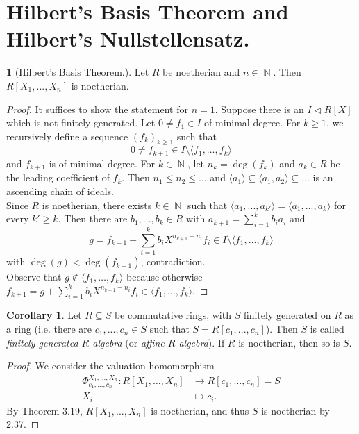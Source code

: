 \documentclass[12pt,a4paper]{report}
\theoremstyle{definition}
\newtheorem{corollary}[theorem]{Corollary} %
\theoremstyle{num.custom-title}
\newtheorem{teo_custom-title}[theorem]{} %
\DeclareMathOperator{\N}{\mathbb{N}}
\DeclareMathOperator{\sm}{\setminus}
\DeclareMathOperator{\sse}{\subseteq}
\begin{document}
\section{Hilbert's Basis Theorem and Hilbert's Nullstellensatz.}

\begin{teo_custom-title}[Hilbert's Basis Theorem.]
Let $R$ be noetherian and $n \in \N$. Then $R[X_1,...,X_n]$ is noetherian.
\begin{proof}
It suffices to show the statement for $n=1$. Suppose there is an $I \lhd R[X]$ which is not finitely generated. Let $0 \neq f_1 \in I$ of minimal degree. For $k \geq 1$, we recursively define a sequence $(f_k)_{k \geq 1}$ such that
\[
0 \neq f_{k+1} \in I \sm \langle f_1, \ldots , f_k \rangle
\]
and $f_{k+1}$ is of minimal degree. For $k \in \N$, let $n_k = \deg(f_k)$ and $a_k \in R$ be the leading coefficient of $f_k$. Then $n_1 \leq n_2 \leq ...$ and $\langle a_1 \rangle \sse \langle a_1,a_2 \rangle \sse ...$ is an ascending chain of ideals.\\
Since $R$ is noetherian, there exists $k \in \N$ such that $\langle a_1,...,a_{k'} \rangle = \langle a_1,...,a_k \rangle$ for every $k' \geq k$. Then there are $b_1,...,b_k \in R$ with $a_{k+1} = \sum_{i=1}^k b_i a_i$ and
\[
g = f_{k+1} - \sum_{i=1}^k b_i X^{n_{k+1}-n_i} f_i \in I \sm \langle f_1, \ldots, f_k \rangle
\]
with $\deg(g) < \deg(f_{k+1})$, contradiction.\\
Observe that $g \not\in \langle f_1, \ldots, f_k \rangle$ because otherwise $f_{k+1} = g + \sum_{i=1}^k b_i X^{n_{k+1}-n_i} f_i \in \langle f_1,...,f_k \rangle$.
\end{proof}
\end{teo_custom-title}

\begin{corollary}
Let $R \sse S$ be commutative rings, with $S$ finitely generated on $R$ as a ring (i.e. there are $c_1,...,c_n \in S$ such that $S=R[c_1,...,c_n]$). Then $S$ is called \emph{finitely generated $R$-algebra} (or \emph{affine $R$-algebra}). If $R$ is noetherian, then so is $S$.
\begin{proof}
We consider the valuation homomorphism
\begin{align*}
\Phi_{c_1,\ldots,c_n}^{X_1,...,X_n} \colon R[X_1,\ldots,X_n] & \to R[c_1,\ldots,c_n]=S \\
X_i & \mapsto c_i.
\end{align*}
By Theorem 3.19, $R[X_1,...,X_n]$ is noetherian, and thus $S$ is noetherian by 2.37.
\end{proof}
\end{corollary}
\end{document}
